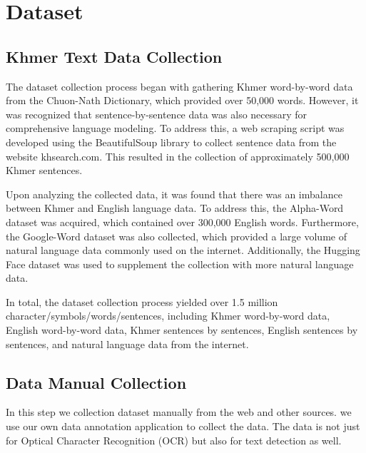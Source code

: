 
\chapter{Dataset}
\label{ch:dataset}
\section{Khmer Text Data Collection}
\label{sec:text-source}

The dataset collection process began with gathering Khmer word-by-word data from the 
Chuon-Nath Dictionary, which provided over 50,000 words. However, it was recognized 
that sentence-by-sentence data was also necessary for comprehensive language modeling. 
To address this, a web scraping script was developed using the BeautifulSoup library 
to collect sentence data from the website khsearch.com. This resulted in the collection 
of approximately 500,000 Khmer sentences.

Upon analyzing the collected data, it was found that there was an imbalance between 
Khmer and English language data. To address this, the Alpha-Word dataset was acquired,
which contained over 300,000 English words. Furthermore, the Google-Word dataset 
was also collected, which provided a large volume of natural language data commonly 
used on the internet. Additionally, the Hugging Face dataset was used to supplement 
the collection with more natural language data.

In total, the dataset collection process yielded over 1.5 million 
character/symbols/words/sentences, including Khmer word-by-word data, 
English word-by-word data, Khmer sentences by sentences, English 
sentences by sentences, and natural language data from the internet.

\section{Data Manual Collection}
\label{sec:manualcollection}
In this step we collection dataset manually from the web and other sources. we 
use our own data annotation application to collect the data. The data is not just for Optical 
Character Recognition (OCR) but also for text detection as well.

